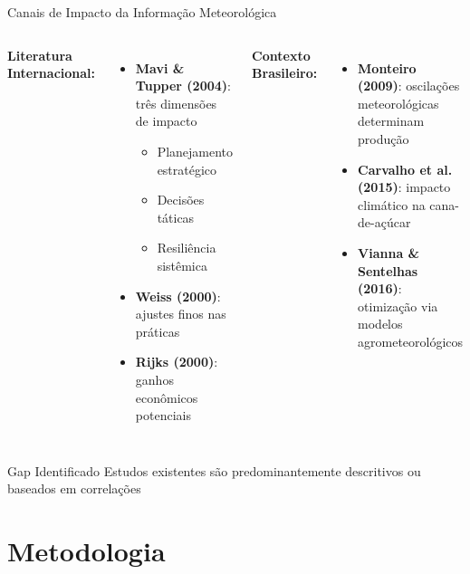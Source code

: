 \documentclass[10pt,aspectratio=169]{beamer}
\begin{document}
\begin{frame}{Canais de Impacto da Informação Meteorológica}
\begin{columns}
\textbf{Literatura Internacional:}
\begin{itemize}
    \item \textbf{Mavi \& Tupper (2004)}: três dimensões de impacto
    \begin{itemize}
        \item Planejamento estratégico
        \item Decisões táticas
        \item Resiliência sistêmica
    \end{itemize}
    \item \textbf{Weiss (2000)}: ajustes finos nas práticas
    \item \textbf{Rijks (2000)}: ganhos econômicos potenciais
\end{itemize}

\textbf{Contexto Brasileiro:}
\begin{itemize}
    \item \textbf{Monteiro (2009)}: oscilações meteorológicas determinam produção
    \item \textbf{Carvalho et al. (2015)}: impacto climático na cana-de-açúcar
    \item \textbf{Vianna \& Sentelhas (2016)}: otimização via modelos agrometeorológicos
\end{itemize}
\end{columns}

\vspace{0.3cm}
\begin{block}{Gap Identificado}
Estudos existentes são predominantemente descritivos ou baseados em correlações
\end{block}
\end{frame}

\section{Metodologia}
\end{document}
